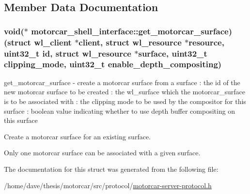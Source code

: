 \subsection{Member Data Documentation}
\hypertarget{structmotorcar__shell__interface_af2f516fa4585245d6b7db1fbec34419e}{
\subsubsection[{get\-\_\-motorcar\-\_\-surface}]{\setlength{\rightskip}{0pt plus 5cm}void($\ast$ motorcar\-\_\-shell\-\_\-interface\-::get\-\_\-motorcar\-\_\-surface)(struct wl\-\_\-client $\ast$client, struct wl\-\_\-resource $\ast$resource, uint32\-\_\-t id, struct wl\-\_\-resource $\ast${\bf surface}, uint32\-\_\-t clipping\-\_\-mode, uint32\-\_\-t enable\-\_\-depth\-\_\-compositing)}}\label{structmotorcar__shell__interface_af2f516fa4585245d6b7db1fbec34419e}
get\-\_\-motorcar\-\_\-surface -\/ create a motorcar surface from a surface \-: the id of the new motorcar surface to be created \-: the wl\-\_\-surface which the motorcar\-\_\-surface is to be associated with \-: the clipping mode to be used by the compositor for this surface \-: boolean value indicating whether to use depth buffer compositing on this surface

Create a motorcar surface for an existing surface.

Only one motorcar surface can be associated with a given surface. 

The documentation for this struct was generated from the following file\-:\begin{DoxyCompactItemize}
\item 
/home/dave/thesis/motorcar/src/protocol/\hyperlink{motorcar-server-protocol_8h}{motorcar-\/server-\/protocol.\-h}\end{DoxyCompactItemize}
